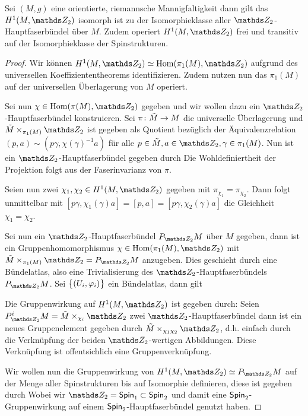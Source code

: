 \begin{Satz}\label{anzahlspin}
	Sei $ (M,g) $ eine orientierte, riemannsche Mannigfaltigkeit dann
	gilt das $ H^1(M,\Z_2) $ isomorph ist zu der Isomorphieklasse aller $ \Z_2 $-Hauptfaserbündel über $ M $. Zudem operiert $ H^1(M,\Z_2) $ frei
	und transitiv auf der Isomorphieklasse der Spinstrukturen.
	\begin{proof}
		Wir können $ H^1(M,\Z_2)\simeq \Hom(\pi_1(M),\Z_2) $ aufgrund des universellen
		Koeffiziententheorems identifizieren. Zudem nutzen nun das $ \pi_1(M) $
		auf der universellen Überlagerung von $ M $ operiert.
		
		Sei nun $ \chi\in\Hom(\pi(M),\Z_2) $ gegeben und wir wollen dazu
		ein $ \Z_2 $-Hauptfaserbündel konstruieren. Sei $ \pi \colon \tilde{M} \rightarrow M $ die universelle Überlagerung
		und $ \tilde{M}\times_{\pi_1(M)}\Z_2 $ ist gegeben als
		Quotient bezüglich der Äquivalenzrelation  $ (p,a) \sim (p\gamma,\chi(\gamma)^{-1}a) $ für alle $ p\in\tilde{M},a\in\Z_2,\gamma\in\pi_1(M) $.
		Nun ist ein $ \Z_2 $-Hauptfaserbündel gegeben durch
		Die Wohldefiniertheit der Projektion folgt aus der Faserinvarianz
		von $ \pi $.
		
		Seien nun zwei $ \chi_1,\chi_2\in H^1(M,\Z_2) $ gegeben mit $ \pi_{\chi_1}=\pi_{\chi_2} $. Dann folgt unmittelbar mit $ [p\gamma,\chi_1(\gamma)a] = [p,a] = [p\gamma,\chi_2(\gamma)a] $
		die Gleichheit $ \chi_1=\chi_2 $.
		
		Sei nun ein $ \Z_2 $-Hauptfaserbündel $ \Ph{\Z_2}{M} $ über $ M $
		gegeben, dann ist ein Gruppenhomomorphismus $ \chi\in\Hom(\pi_1(M),\Z_2) $ mit $ \tilde{M}\times_{\pi_1(M)} \Z_2 = \Ph{\Z_2}{M}$ anzugeben. Dies geschieht durch
		eine Bündelatlas, also eine Trivialisierung des $ \Z_2 $-Hauptfaserbündels $ \Ph{\Z_2}{M} $. Sei $ \bigl\{  (U_i,\varphi_i) \bigr\}$ ein Bündelatlas, dann gilt
		
		
		Die Gruppenwirkung auf $ H^1(M,\Z_2) $ ist gegeben durch:
		Seien $ P^i_{\Z_2}M=\tilde{M} \times_{\chi_i} \Z_2 $ zwei $ \Z_2 $-Hauptfaserbündel dann ist ein neues Gruppenelement gegeben
		durch $ \tilde{M} \times_{\chi_1\chi_2} \Z_2 $, d.h.
		einfach durch die Verknüpfung der beiden $ \Z_2 $-wertigen
		Abbildungen. Diese Verknüpfung ist offentsichlich eine
		Gruppenverknüpfung.
		
		Wir wollen nun die Gruppenwirkung von $ H^1(M,\Z_2)\simeq \Ph{\Z_2}{M} $ auf der Menge aller Spinstrukturen bis auf Isomorphie definieren,
		diese ist gegeben durch
		Wobei wir $ \Z_2=\spin_1\subset\spin_2 $ und damit eine $ \operatorname{\mathsf{Spin}}_2 $-
		Gruppenwirkung auf einem $ \operatorname{\mathsf{Spin}}_2 $-Hauptfaserbündel genutzt haben.
		

\end{proof}
\end{Satz}
